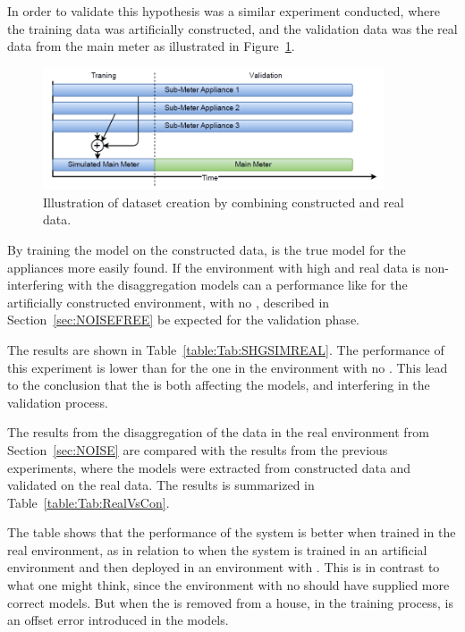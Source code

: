 In order to validate this hypothesis was a similar experiment conducted, where the training data was artificially constructed, and the validation data was the real data from the main meter as illustrated in Figure~\ref{fig:SHGSIMREAL}. 

\begin{figure}[H]
\centering
\includegraphics[width=0.9\textwidth]{billeder/SIMREAL.png}
\caption{Illustration of dataset creation by combining constructed and real data.}
\label{fig:SHGSIMREAL}
\end{figure}

By training the model on the constructed data, is the true model for the appliances more easily found. If the environment with high  and real data is non-interfering with the disaggregation models can a performance like for the artificially constructed environment, with no , described in Section~\ref{sec:NOISEFREE} be expected for the validation phase. 




The results are shown in Table~\ref{table:Tab:SHGSIMREAL}. The performance of this experiment is lower than for the one in the environment with no . This lead to the conclusion that the  is both affecting the models, and interfering in the validation process.  

The results from the disaggregation of the data in the real environment from Section~\ref{sec:NOISE} are compared with the results from the previous experiments, where the models were extracted from constructed data and validated on the real data. The results is summarized in Table~\ref{table:Tab:RealVsCon}. 



The table shows that the performance of the system is better when trained in the real environment, as in relation to when the system is trained in an artificial environment and then deployed in an environment with . This is in contrast to what one might think, since the environment with no  should have supplied more correct models. But when the  is removed from a house, in the training process, is an offset error introduced in the models. 

